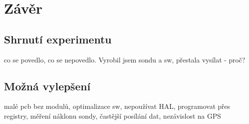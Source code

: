 \documentclass[twoside]{ctuthesis}
\theoremstyle{plain}
\theoremstyle{definition}
\theoremstyle{note}
\begin{document}
	
	
















	


\chapter{Závěr}
	\section{Shrnutí experimentu}
	co se povedlo, co se nepovedlo. Vyrobil jsem sondu a sw, přestala vysílat - proč? 

	\section{Možná vylepšení}
	malé pcb bez modulů, optimalizace sw, nepoužívat HAL, programovat přes registry, měření náklonu sondy, častější posílání dat, nezávislost na GPS

	
















	


\appendix

\printindex

\appendix




\end{document}
